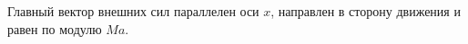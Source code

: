 Главный вектор внешних сил параллелен оси $x$,
направлен в сторону движения и равен по модулю $Ma$.
